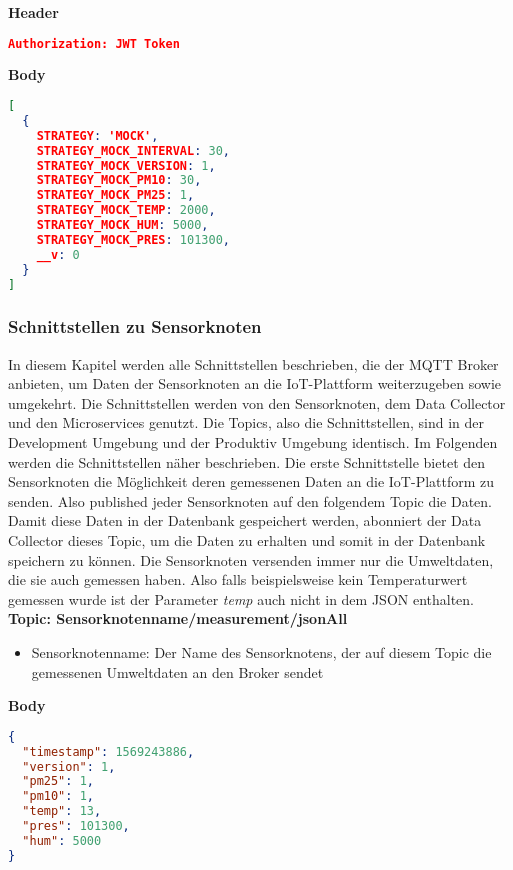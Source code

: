 \textbf{Header}
\begin{lstlisting}[language=json,firstnumber=1,basicstyle=\footnotesize]
Authorization: JWT Token
\end{lstlisting}
\textbf{Body}
\begin{lstlisting}[language=json,firstnumber=1,basicstyle=\footnotesize]
[
  { 
    STRATEGY: 'MOCK',
    STRATEGY_MOCK_INTERVAL: 30,
    STRATEGY_MOCK_VERSION: 1,
    STRATEGY_MOCK_PM10: 30,
    STRATEGY_MOCK_PM25: 1,
    STRATEGY_MOCK_TEMP: 2000,
    STRATEGY_MOCK_HUM: 5000,
    STRATEGY_MOCK_PRES: 101300,
    __v: 0
  }
]
\end{lstlisting}

\subsubsection{Schnittstellen zu Sensorknoten}
\label{sec:arch:iot:ssk}
In diesem Kapitel werden alle Schnittstellen beschrieben, die der MQTT Broker anbieten, um Daten der Sensorknoten an die IoT-Plattform weiterzugeben sowie umgekehrt.
Die Schnittstellen werden von den Sensorknoten, dem Data Collector und den Microservices genutzt.
Die Topics, also die Schnittstellen, sind in der Development Umgebung und der Produktiv Umgebung identisch.
Im Folgenden werden die Schnittstellen näher beschrieben.
\newline 
Die erste Schnittstelle bietet den Sensorknoten die Möglichkeit deren gemessenen Daten an die IoT-Plattform zu senden.
Also published jeder Sensorknoten auf den folgendem Topic die Daten.
Damit diese Daten in der Datenbank gespeichert werden, abonniert der Data  Collector dieses Topic, um die Daten zu erhalten und somit in der Datenbank speichern zu können.
Die Sensorknoten versenden immer nur die Umweltdaten, die sie auch gemessen haben.
Also falls beispielsweise kein Temperaturwert gemessen wurde ist der Parameter \textit{temp} auch nicht in dem JSON enthalten.
\newline 
\textbf{Topic: Sensorknotenname/measurement/jsonAll} \\
\begin{itemize}
	\item Sensorknotenname: Der Name des Sensorknotens, der auf diesem Topic die gemessenen Umweltdaten an den Broker sendet
\end{itemize}
\textbf{Body}
\begin{lstlisting}[language=json,firstnumber=1,basicstyle=\footnotesize]
{
  "timestamp": 1569243886,
  "version": 1,
  "pm25": 1,
  "pm10": 1,
  "temp": 13,
  "pres": 101300,
  "hum": 5000
}
\end{lstlisting}
